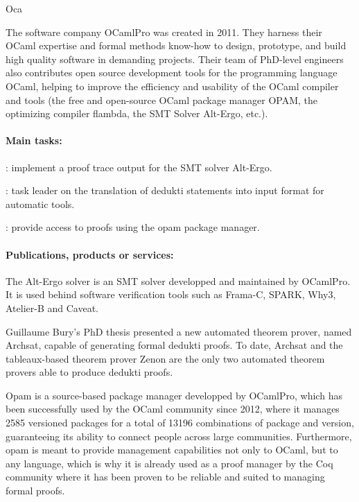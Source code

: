 \begin{sitedescription}{Oca}


The software company OCamlPro was created in 2011. They harness their OCaml expertise and formal methods know-how to design, prototype, and build high quality software in demanding projects. Their team of PhD-level engineers also contributes open source development tools for the programming language OCaml, helping to improve the efficiency and usability of the OCaml compiler and tools (the free and open-source OCaml package manager OPAM, the optimizing compiler flambda, the SMT Solver Alt-Ergo, etc.).

\paragraph*{Main tasks:}

\begin{compactitem}
\item {}: implement a proof trace output for the SMT solver Alt-Ergo.
\item {}: task leader on the translation of dedukti statements into input format for automatic tools.
\item {}: provide access to proofs using the opam package manager.
\end{compactitem}

\paragraph*{Publications, products or services:}

\begin{compactitem}
\item The Alt-Ergo solver\cite{ae2.2} is an SMT solver developped and maintained by OCamlPro.
  It is used behind software verification tools such as Frama-C, SPARK, Why3,
  Atelier-B and Caveat.
\item Guillaume Bury's PhD thesis\cite{BURY19} presented a new automated theorem
  prover, named Archsat, capable of generating formal dedukti proofs. To date,
  Archsat and the tableaux-based theorem prover Zenon are the only two automated
  theorem provers able to produce dedukti proofs.
\item Opam\cite{OPAM} is a source-based package manager developped by OCamlPro,
  which has been successfully used by the OCaml community since 2012, where
  it manages 2585 versioned packages for a total of 13196 combinations of package
  and version, guaranteeing its ability to connect people across large communities.
  Furthermore, opam is meant to provide management capabilities not only to
  OCaml, but to any language, which is why it is already used as a proof manager
  by the Coq community where it has been proven to be reliable and suited to
  managing formal proofs.
\end{compactitem}


\end{sitedescription}
